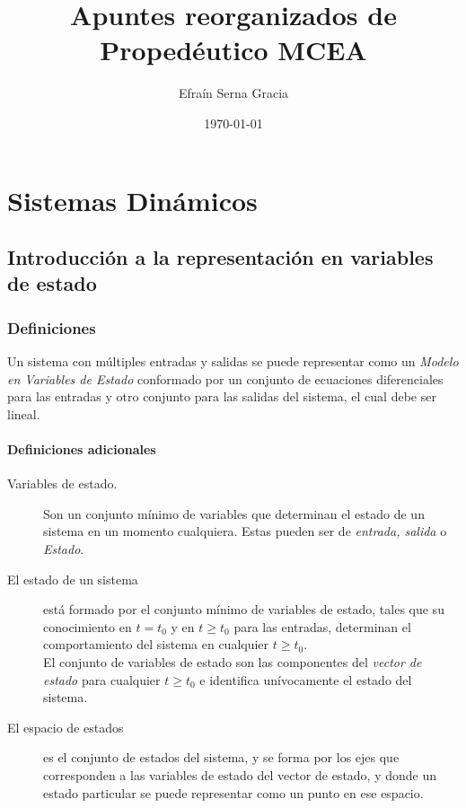 \documentclass[12pt,spanish,lettersize]{report}
\title{\color{Maroon}Apuntes reorganizados de Proped\'eutico MCEA}
\author{Efra\'in Serna Gracia}
\date{\color{gray}\today}
\begin{document}
\maketitle
\tableofcontents
\chapter{Sistemas Din\'amicos}
\section{Introducci\'on a la representaci\'on en variables de estado}
\subsection{Definiciones}
Un sistema con m\'ultiples entradas y salidas se puede representar como un \emph{Modelo en Variables de Estado} conformado por un conjunto de ecuaciones diferenciales para las entradas y otro conjunto para las salidas del sistema, el cual debe ser lineal.
\subsubsection{Definiciones adicionales}
\begin{description}
\item[Variables de estado.] Son un conjunto m\'inimo de variables que determinan el estado de un sistema en un momento cualquiera. Estas pueden ser de \emph{entrada, salida} o \emph{Estado}.
\item[El estado de un sistema] est\'a formado por el conjunto m\'inimo de variables de estado, tales que su conocimiento en $t=t_0$ y en $t\ge t_0$ para las entradas, determinan el comportamiento del sistema en cualquier $t \ge t_0$.\\
El conjunto de variables de estado son las componentes del \emph{vector de estado} para cualquier $t \ge t_0$ e identifica un\'ivocamente el estado del sistema.
\item[El espacio de estados] es el conjunto de estados del sistema, y se forma por los ejes que corresponden a las variables de estado del vector de estado, y donde un estado particular se puede representar como un punto en ese espacio.
\end{description}
\end{document}
